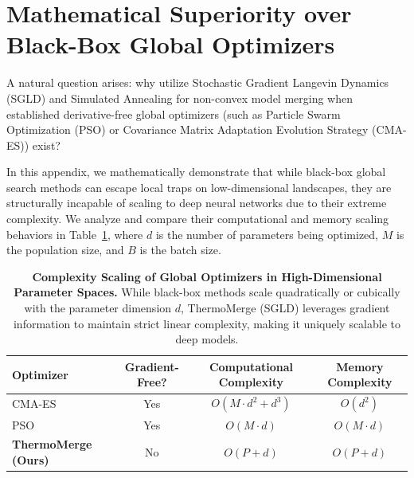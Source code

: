 \documentclass{article}
\theoremstyle{plain}
\theoremstyle{definition}
\theoremstyle{remark}
\begin{document}










\newpage
\appendix
\onecolumn
\section{Mathematical Superiority over Black-Box Global Optimizers}
\label{sec:global_optimizers}

A natural question arises: why utilize Stochastic Gradient Langevin Dynamics (SGLD) and Simulated Annealing for non-convex model merging when established derivative-free global optimizers (such as Particle Swarm Optimization (PSO) or Covariance Matrix Adaptation Evolution Strategy (CMA-ES)) exist? 

In this appendix, we mathematically demonstrate that while black-box global search methods can escape local traps on low-dimensional landscapes, they are structurally incapable of scaling to deep neural networks due to their extreme complexity. We analyze and compare their computational and memory scaling behaviors in Table~\ref{tab:optimizer_complexity}, where $d$ is the number of parameters being optimized, $M$ is the population size, and $B$ is the batch size.

\begin{table}[h]
\caption{\textbf{Complexity Scaling of Global Optimizers in High-Dimensional Parameter Spaces.} While black-box methods scale quadratically or cubically with the parameter dimension $d$, ThermoMerge (SGLD) leverages gradient information to maintain strict linear complexity, making it uniquely scalable to deep models.}
\label{tab:optimizer_complexity}
\vskip 0.15in
\begin{center}
\begin{small}
\begin{sc}
\begin{tabular}{lccc}
\toprule
Optimizer & Gradient-Free? & Computational Complexity & Memory Complexity \\
\midrule
CMA-ES & Yes & $O(M \cdot d^2 + d^3)$ & $O(d^2)$ \\
PSO & Yes & $O(M \cdot d)$ & $O(M \cdot d)$ \\
\textbf{ThermoMerge (Ours)} & No & $O(P + d)$ & $O(P + d)$ \\
\bottomrule
\end{tabular}
\end{sc}
\end{small}
\end{center}
\vskip -0.1in
\end{table}
\end{document}
